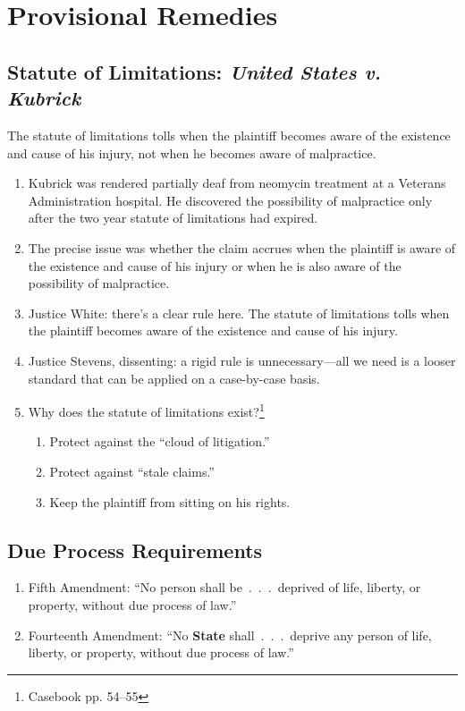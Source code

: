 \section{Provisional Remedies}

\subsection{Statute of Limitations: \emph{United States v. Kubrick}}

 The statute of limitations tolls when the plaintiff becomes aware of the 
 existence and cause of his injury, not when he becomes aware of malpractice.

\begin{enumerate}
    \item Kubrick was rendered partially deaf from neomycin treatment at a
    Veterans Administration hospital. He discovered the possibility of 
    malpractice only after the two year statute of limitations had expired.
    \item The precise issue was whether the claim accrues when the plaintiff 
    is aware of the existence and cause of his injury or when he is also aware 
    of the possibility of malpractice.
    \item Justice White: there's a clear rule here. The statute of limitations 
    tolls when the plaintiff becomes aware of the existence and cause of his 
    injury.
    \item Justice Stevens, dissenting: a rigid rule is unnecessary---all we 
    need is a looser standard that can be applied on a case-by-case basis.
    \item Why does the statute of limitations exist?\footnote{Casebook pp.  
    54--55}
    \begin{enumerate}
        \item Protect against the ``cloud of litigation.''
        \item Protect against ``stale claims.''
        \item Keep the plaintiff from sitting on his rights.
    \end{enumerate}
\end{enumerate}

\subsection{Due Process Requirements}

\begin{enumerate}
    \item Fifth Amendment: ``No person shall be~.~.~.~deprived of life, 
    liberty, or property, without due process of law.''
    \item Fourteenth Amendment: ``No \textbf{State} shall~.~.~.~deprive any 
    person of life, liberty, or property, without due process of law.''
\end{enumerate}

